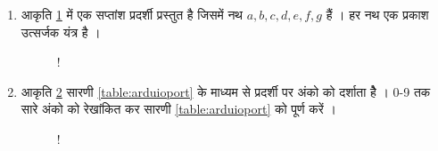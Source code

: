 \renewcommand{\theequation}{\theenumi}
\renewcommand{\thefigure}{\theenumi}
\begin{enumerate}[label=\thesection.\arabic*.,ref=\thesection.\theenumi]

\item  आकृति \ref{fig:sevenseg} में एक सप्तांश   प्रदर्शी प्रस्तुत है जिसमें नथ  $a,b,c,d,e,f,g$ हैं ।  हर नथ एक प्रकाश उत्सर्जक यंत्र है ।

\begin{figure}[!ht]
\centering
\resizebox {\columnwidth} {!} {

}
\caption{}
\label{fig:sevenseg}
\end{figure}

\item आकृति \ref{fig:sevenseg12} सारणी \ref{table:arduioport} के माध्यम से  प्रदर्शी पर अंको को दर्शाता हैे । 0-9 तक सारे अंको को रेखांकित कर सारणी \ref{table:arduioport}  को पूर्ण करें ।

\begin{figure}[!h]
\begin{center}
\resizebox {\columnwidth} {!} {

}
\end{center}
\caption{}
\label{fig:sevenseg12}
\end{figure}


\begin{table}[!h]
\centering

\caption{}
\label{table:arduioport}
\end{table}


\end{enumerate}
